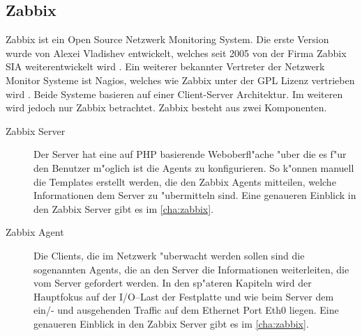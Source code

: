 \subsection{Zabbix}
Zabbix ist ein Open Source Netzwerk Monitoring System. Die erste Version wurde von Alexei Vladishev entwickelt, welches %
seit 2005 von der Firma Zabbix SIA weiterentwickelt wird \autocite{zabbix:Web}. %
Ein weiterer bekannter Vertreter der Netzwerk Monitor Systeme ist Nagios, welches wie Zabbix unter der GPL Lizenz vertrieben wird \autocite{wiki:Nagios}. %
Beide Systeme basieren auf einer Client-Server Architektur. Im weiteren wird jedoch nur Zabbix betrachtet. %
Zabbix besteht aus zwei Komponenten. %

\begin{description}
\item[Zabbix Server]Der Server hat eine auf PHP basierende Weboberfl"ache "uber die es f"ur den Benutzer m"oglich ist die Agents zu %
konfigurieren. So k"onnen manuell die Templates erstellt werden, die den Zabbix Agents mitteilen, welche Informationen dem %
Server zu "ubermitteln sind. Eine genaueren Einblick in den Zabbix Server gibt es im \cref{cha:zabbix}. %
\item[Zabbix Agent]Die Clients, die im Netzwerk "uberwacht werden sollen sind die sogenannten Agents, die an den Server %
die Informationen weiterleiten, die vom Server gefordert werden. In den sp"ateren Kapiteln wird der Hauptfokus auf der %
I/O--Last der Festplatte und wie beim Server dem ein/- und ausgehenden Traffic auf dem Ethernet Port Eth0 liegen. %
Eine genaueren Einblick in den Zabbix Server gibt es im \cref{cha:zabbix}. %
\end{description} 

